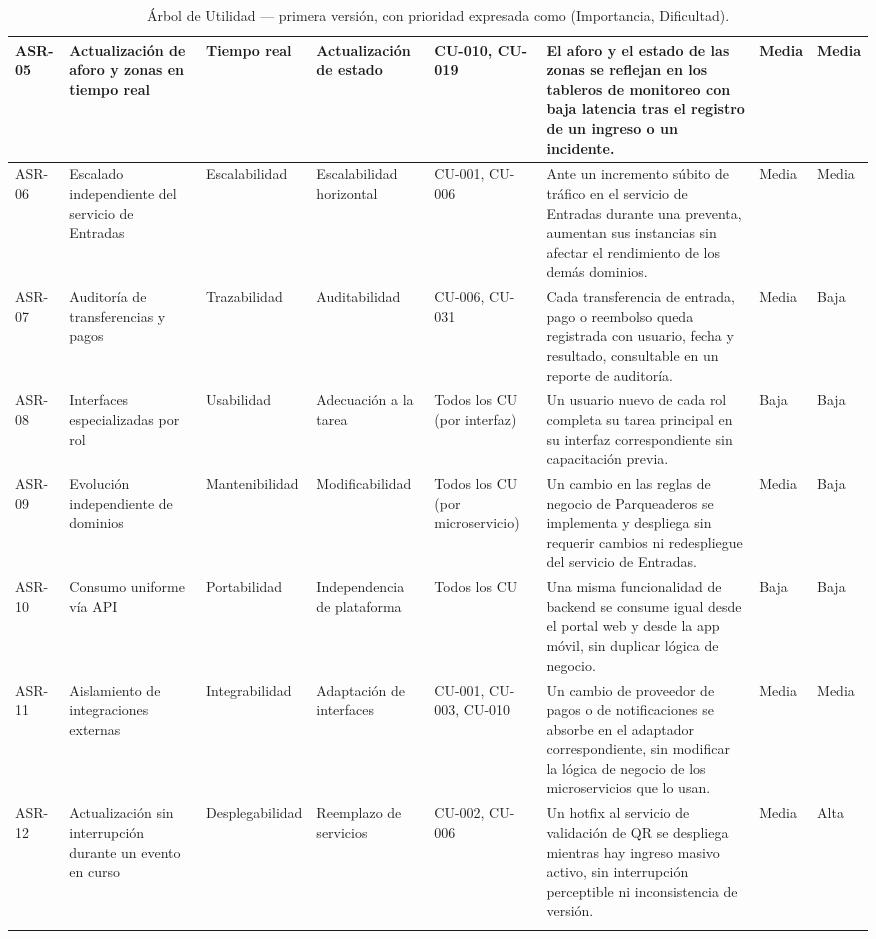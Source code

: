 \documentclass[11pt,a4paper]{article}
\begin{document}
\begin{center}
\begin{longtable}{|p{1.1cm}|p{2cm}|p{1.8cm}|p{1.7cm}|p{1.8cm}|p{3.6cm}|p{1.1cm}|p{1.1cm}|}
\hline
ASR-05 & Actualización de aforo y zonas en tiempo real & Tiempo real & Actualización de estado &
CU-010, CU-019 & El aforo y el estado de las zonas se reflejan en los tableros de monitoreo con
baja latencia tras el registro de un ingreso o un incidente. & Media & Media\\
\hline
ASR-06 & Escalado independiente del servicio de Entradas & Escalabilidad & Escalabilidad
horizontal & CU-001, CU-006 & Ante un incremento súbito de tráfico en el servicio de Entradas
durante una preventa, aumentan sus instancias sin afectar el rendimiento de los demás dominios. &
Media & Media\\
\hline
ASR-07 & Auditoría de transferencias y pagos & Trazabilidad & Auditabilidad & CU-006, CU-031 &
Cada transferencia de entrada, pago o reembolso queda registrada con usuario, fecha y resultado,
consultable en un reporte de auditoría. & Media & Baja\\
\hline
ASR-08 & Interfaces especializadas por rol & Usabilidad & Adecuación a la tarea & Todos los CU
(por interfaz) & Un usuario nuevo de cada rol completa su tarea principal en su interfaz
correspondiente sin capacitación previa. & Baja & Baja\\
\hline
ASR-09 & Evolución independiente de dominios & Mantenibilidad & Modificabilidad & Todos los CU
(por microservicio) & Un cambio en las reglas de negocio de Parqueaderos se implementa y despliega
sin requerir cambios ni redespliegue del servicio de Entradas. & Media & Baja\\
\hline
ASR-10 & Consumo uniforme vía API & Portabilidad & Independencia de plataforma & Todos los CU &
Una misma funcionalidad de backend se consume igual desde el portal web y desde la app móvil, sin
duplicar lógica de negocio. & Baja & Baja\\
\hline
ASR-11 & Aislamiento de integraciones externas & Integrabilidad & Adaptación de interfaces &
CU-001, CU-003, CU-010 & Un cambio de proveedor de pagos o de notificaciones se absorbe en el
adaptador correspondiente, sin modificar la lógica de negocio de los microservicios que lo usan. &
Media & Media\\
\hline
ASR-12 & Actualización sin interrupción durante un evento en curso & Desplegabilidad & Reemplazo
de servicios & CU-002, CU-006 & Un hotfix al servicio de validación de QR se despliega mientras
hay ingreso masivo activo, sin interrupción perceptible ni inconsistencia de versión. & Media &
Alta\\
\hline
\caption{Árbol de Utilidad — primera versión, con prioridad expresada como (Importancia,
Dificultad).}
\label{tab:asr}
\end{longtable}
\end{center}
\end{document}

